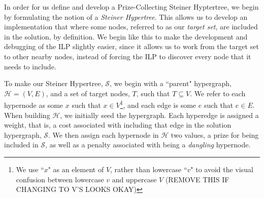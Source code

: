 \documentclass[12pt,twoside]{reedthesis}
\theoremstyle{definition}
\begin{document}
In order for us define and develop a Prize-Collecting Steiner Hyptertree, we begin by formulating the notion of a \textit{Steiner Hypertree}. This allows us to develop an implementation that where some nodes, referred to as our \textit{target set}, are included in the solution, by definition. We begin like this to make the development and debugging of the ILP slightly easier, since it allows us to work from the target set to other nearby nodes, instead of forcing the ILP to discover every node that it needs to include.\par
To make our Steiner Hypertree, $\mathcal{S}$, we begin with a ``parent" hypergraph, $\mathcal{H} = (V,E)$, and a set of target nodes, $T$, such that $T \subseteq V$.  We refer to each hypernode as some $x$ such that $x \in V$\footnote{We use ``$x$" as an element of $V$, rather than lowercase ``$v$" to avoid the visual confusion between lowercase $v$ and uppercase $V$ (REMOVE THIS IF CHANGING TO V'S LOOKS OKAY)}, and each edge is some $e$ such that $e \in E$.  When building $\mathcal{H}$, we initially seed the hypergraph.  Each hyperedge is assigned a weight, that is, a cost associated with including that edge in the solution hypergraph, $\mathcal{S}$.  We then assign each hypernode in $\mathcal{H}$ two values, a prize for being included in $\mathcal{S}$, as well as a penalty associated with being a \textit{dangling} hypernode.\par



%
\end{document}
